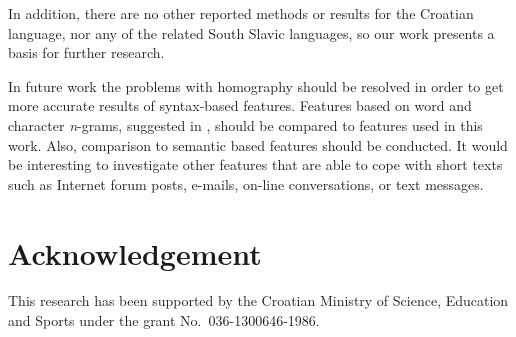 \documentclass{llncs}
\begin{document}
In addition, there are no other reported methods or results for the Croatian
language, nor any of the related South Slavic languages, so our work presents a
basis for further research.

In future work the problems with homography should be resolved in order to
get more accurate results of syntax-based features. Features based on word and
character \emph{n}-grams, suggested in
\cite{coyotl2006authorship,keselj2003n,peng2003language}, should be compared to
features used in this work. Also, comparison to semantic based features
should be conducted. It would be interesting to investigate other features
that are able to cope with short texts such as Internet forum posts, e-mails,
on-line conversations, or text messages.


\section*{Acknowledgement}
This research has been supported by the Croatian Ministry of Science, Education
and Sports under the grant No.~036-1300646-1986.



\end{document}

